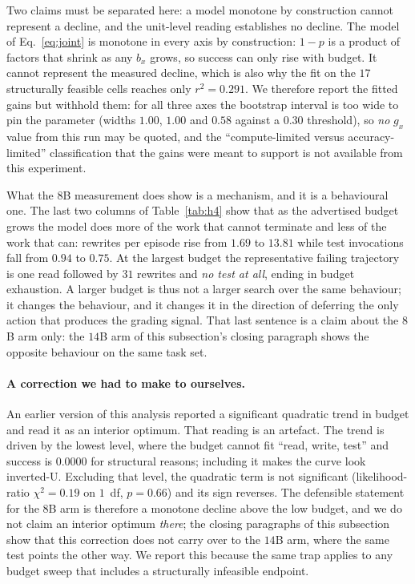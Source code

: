 \documentclass[10pt]{article} %
\begin{document}
Two claims must be separated here: a model monotone by construction cannot represent a decline, and the unit-level reading establishes no decline. The model of
Eq.~\eqref{eq:joint} is monotone in every axis by construction: $1-p$ is a product of
factors that shrink as any $b_x$ grows, so success can only rise with budget. It cannot
represent the measured decline, which is also why the fit on the $17$ structurally
feasible cells reaches only $r^2{=}0.291$. We therefore report the fitted gains but
withhold them: for all three axes the bootstrap interval is too wide to pin the
parameter (widths $1.00$, $1.00$ and $0.58$ against a $0.30$ threshold), so \emph{no}
$g_x$ value from this run may be quoted, and the ``compute-limited versus
accuracy-limited'' classification that the gains were meant to support is not available
from this experiment.

What the $8$B measurement does show is a mechanism, and it is a behavioural one. The last
two columns of Table~\ref{tab:h4} show that as the advertised budget grows the model
does more of the work that cannot terminate and less of the work that can: rewrites per
episode rise from $1.69$ to $13.81$ while test invocations fall from $0.94$ to $0.75$. At
the largest budget the representative failing trajectory is one read followed by $31$
rewrites and \emph{no test at all}, ending in budget exhaustion. A larger budget is thus
not a larger search over the same behaviour; it changes the behaviour, and it changes it
in the direction of deferring the only action that produces the grading signal. That last
sentence is a claim about the $8$B arm only: the $14$B arm of this subsection's closing
paragraph shows the opposite behaviour on the same task set.

\paragraph{A correction we had to make to ourselves.}
An earlier version of this analysis reported a significant quadratic trend in budget and
read it as an interior optimum. That reading is an artefact. The trend is driven by the
lowest level, where the budget cannot fit ``read, write, test'' and success is $0.0000$
for structural reasons; including it makes the curve look inverted-U. Excluding that
level, the quadratic term is not significant (likelihood-ratio $\chi^2{=}0.19$ on $1$~df,
$p{=}0.66$) and its sign reverses. The defensible statement for the $8$B arm is therefore a
monotone decline above the low budget, and we do not claim an interior optimum \emph{there};
the closing paragraphs of this subsection show that this correction does not carry over to
the $14$B arm, where the same test points the other way. We report this
because the same trap applies to any budget sweep that includes a structurally
infeasible endpoint.
\end{document}
